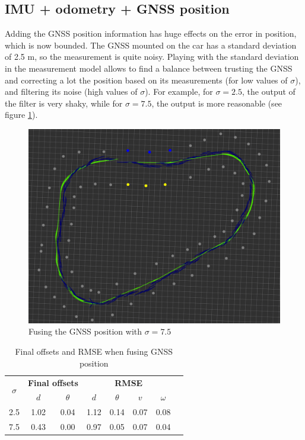 \documentclass[10pt,a4paper, twocolumn]{article}
\begin{document}
\subsection{IMU + odometry + GNSS position}
Adding the GNSS position information has huge effects on the error in position, which is now bounded. The GNSS mounted on the car has a standard deviation of 2.5 m, so the measurement is quite noisy. Playing with the standard deviation in the measurement model allows to find a balance between trusting the GNSS and correcting a lot the position based on its measurements (for low values of $\sigma$), and filtering its noise (high values of $\sigma$). For example, for $\sigma=2.5$, the output of the filter is very shaky, while for $\sigma=7.5$, the output is more reasonable (see figure \ref{fig:gnss_pose}).

\begin{figure}[h]
	\centering
	\includegraphics[width=\columnwidth]{images/gnss_pose.png}
	\caption{Fusing the GNSS position with $\sigma=7.5$}
	\label{fig:gnss_pose}
\end{figure}

\begin{table}[h]
	\begin{center}
		\begin{tabular}{|c|c|c|c|c|c|c|c|}
			\hline
			\multirow{2}{*}{\textbf{$\sigma$}} & \multicolumn{2}{c|}{\textbf{Final offsets}} &  \multicolumn{4}{c|}{\textbf{RMSE}} \\ \cline{2-7}
			  & $d$ & $\theta$ & $d$ & $\theta$ & $v$ & $\omega$ \\ \hline
			2.5 & 1.02 & 0.04 & 1.12 & 0.14 & 0.07 & 0.08 \\
			7.5 & 0.43 & 0.00 & 0.97 & 0.05 & 0.07 & 0.04 \\
			\hline
			
		\end{tabular}
		\caption{Final offsets and RMSE when fusing GNSS position}
	\end{center}	
\end{table}
\end{document}
